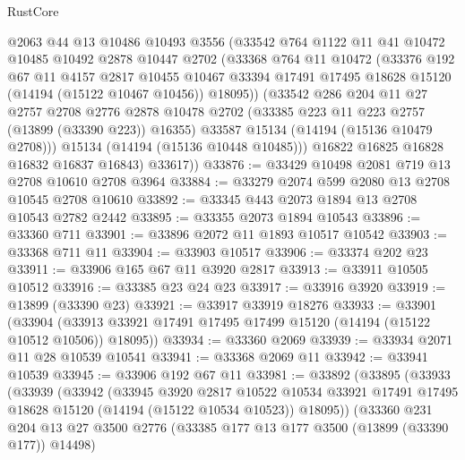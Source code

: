 \begin{lexlean}{RustCore}
\begin{coremodule}
          @2063
          @44
          @13
          @10486
          @10493
          @3556
          (@33542
            @764
            @1122
            @11
            @41
            @10472
            @10485
            @10492
            @2878
            @10447
            @2702
            (@33368
              @764
              @11
              @10472
              (@33376
                @192
                @67
                @11
                @4157
                @2817
                @10455
                @10467
                @33394
                @17491
                @17495
                @18628
                @15120
                (@14194 (@15122 @10467 @10456))
                @18095))
            (@33542
              @286
              @204
              @11
              @27
              @2757
              @2708
              @2776
              @2878
              @10478
              @2702
              (@33385 @223 @11 @223 @2757 (@13899 (@33390 @223)) @16355)
              @33587
              @15134
              (@14194 (@15136 @10479 @2708)))
            @15134
            (@14194 (@15136 @10448 @10485)))
          @16822
          @16825
          @16828
          @16832
          @16837
          @16843)
        @33617))
@33876 := @33429 @10498 @2081 @719 @13 @2708 @10610 @2708 @3964
@33884 := @33279 @2074 @599 @2080 @13 @2708 @10545 @2708 @10610
@33892 := @33345 @443 @2073 @1894 @13 @2708 @10543 @2782 @2442
@33895 := @33355 @2073 @1894 @10543
@33896 := @33360 @711
@33901 := @33896 @2072 @11 @1893 @10517 @10542
@33903 := @33368 @711 @11
@33904 := @33903 @10517
@33906 := @33374 @202 @23
@33911 := @33906 @165 @67 @11 @3920 @2817
@33913 := @33911 @10505 @10512
@33916 := @33385 @23 @24 @23
@33917 := @33916 @3920
@33919 := @13899 (@33390 @23)
@33921 := @33917 @33919 @18276
@33933 := @33901
    (@33904 (@33913 @33921 @17491 @17495 @17499 @15120 (@14194 (@15122 @10512 @10506)) @18095))
@33934 := @33360 @2069
@33939 := @33934 @2071 @11 @28 @10539 @10541
@33941 := @33368 @2069 @11
@33942 := @33941 @10539
@33945 := @33906 @192 @67 @11
@33981 := @33892
    (@33895
      (@33933
        (@33939
          (@33942
            (@33945
              @3920
              @2817
              @10522
              @10534
              @33921
              @17491
              @17495
              @18628
              @15120
              (@14194 (@15122 @10534 @10523))
              @18095))
          (@33360
            @231
            @204
            @13
            @27
            @3500
            @2776
            (@33385 @177 @13 @177 @3500 (@13899 (@33390 @177)) @14498)

\end{coremodule}
\end{lexlean}
